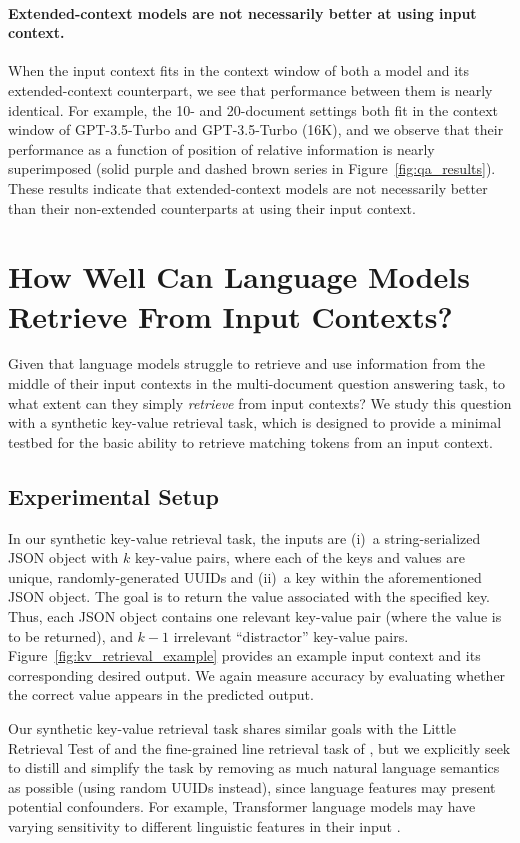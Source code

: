 \paragraph{Extended-context models are not necessarily better at using input context.} When the input context fits in the context window of both a model and its extended-context counterpart, we see that performance between them is nearly identical. For example, the 10- and 20-document settings both fit in the context window of GPT-3.5-Turbo and GPT-3.5-Turbo (16K), and we observe that their performance as a function of position of relative information is nearly superimposed (solid purple and dashed brown series in Figure~\ref{fig:qa_results}). These results indicate that extended-context models are not necessarily better than their non-extended counterparts at using their input context.

\section{How Well Can Language Models Retrieve From Input Contexts?}\label{sec:kv}

Given that language models struggle to retrieve and use information from the middle of their input contexts in the multi-document question answering task, to what extent can they simply \emph{retrieve} from input contexts? We study this question with a synthetic key-value retrieval task, which is designed to provide a minimal testbed for the basic ability to retrieve matching tokens from an input context.

\subsection{Experimental Setup}

In our synthetic key-value retrieval task, the inputs are (i)~a string-serialized JSON object with $k$ key-value pairs, where each of the keys and values are unique, randomly-generated UUIDs and (ii)~a key within the aforementioned JSON object. The goal is to return the value associated with the specified key. Thus, each JSON object contains one relevant key-value pair (where the value is to be returned), and $k-1$ irrelevant ``distractor'' key-value pairs.
Figure~\ref{fig:kv_retrieval_example} provides an example input context and its corresponding desired output. We again measure accuracy by evaluating whether the correct value appears in the predicted output.

Our synthetic key-value retrieval task shares similar goals with the Little Retrieval Test of \citet{littleretrievaltest} and the fine-grained line retrieval task of \citet{longchat2023}, but we explicitly seek to distill and simplify the task by removing as much natural language semantics as possible (using random UUIDs instead), since language features may present potential confounders. For example, Transformer language models may have varying sensitivity to different linguistic features in their input \citep{oconnor-andreas-2021-context}.

